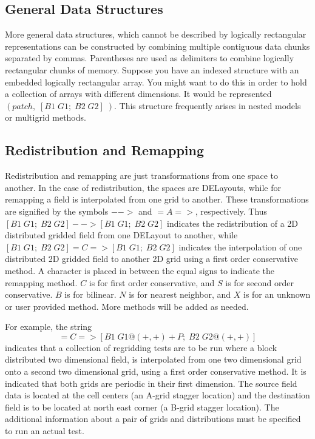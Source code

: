 \subsection{General Data Structures}
More general data structures, which cannot be described by logically rectangular representations can be constructed by combining multiple contiguous data chunks separated by commas. Parentheses are used as delimiters to combine logically rectangular chunks of memory. Suppose you have an indexed structure with an embedded logically rectangular array. You might want to do this in order to hold a collection of arrays with different dimensions.  It would be represented $( patch , \; [ B1 \; G1; \; B2 \; G2 ] \; )$. This structure frequently arises in nested models or multigrid methods.

\subsection{Redistribution and Remapping}
Redistribution and remapping are just transformations from one space to another. In the case of redistribution, the spaces are DELayouts, while for remapping a field is interpolated from one grid to another. These transformations are signified by the symbols $-->$ and $=A=>$, respectively. Thus 
$[ B1 \; G1;\; B2 \; G2 ] -- \!\!\! >  [ B1 \; G1;\; B2 \; G2 ]$ indicates the redistribution of a 2D distributed gridded field from one DELayout to another, while $[ B1 \; G1;\; B2 \; G2 ] =C=>  [ B1 \; G1;\; B2 \; G2 ]$ indicates the interpolation of one distributed 2D gridded field to another 2D grid using a first order conservative method. A character is placed in between the equal signs to indicate the remapping method. $C$ is for first order conservative, and $S$ is for second order conservative. $B$ is for bilinear. $N$ is for nearest neighbor, and $X$ is for an unknown or user provided method. More methods will be added as needed.
 
For example, the string
\begin{displaymath}
[B1 \; G1+P; \; B2 \; G2 ] =C=> [B1 \; G1@(+,+)+P; \; B2 \; G2@(+,+) ] 
\end{displaymath}
indicates that a collection of regridding tests are to be run where a block distributed two dimensional field, is interpolated from one two dimensional grid onto a second two dimensional grid, using a first order conservative method. It is indicated that both grids are periodic in their first dimension. The source field data is located at the cell centers (an A-grid stagger location) and the destination field is to be located at north east corner (a B-grid stagger location). The additional information about a pair of grids and distributions must be specified to run an actual test. 


